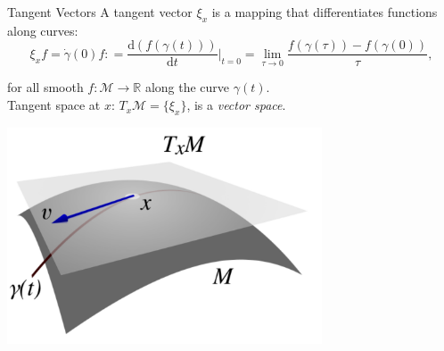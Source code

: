 \documentclass[xcolor=dvipsnames,t]{beamer} %
\newcommand{\reals}{\mathbb{R}}
\newcommand{\drm}{\mathrm{d}}
\newcommand{\defeq}{\mathrel{\mathop:}=}
\begin{document}
\begin{frame}{Tangent Vectors}
   A tangent vector $\xi_x$ is a mapping that differentiates functions along curves:\\[-1em]
   
   \[ \xi_x f = \dot{\gamma}(0)f \defeq \dfrac{\drm(f(\gamma(t)))}{\drm t}\biggr|_{t=0} = \lim_{\tau\to 0}\dfrac{f(\gamma(\tau))-f(\gamma(0))}{\tau}, \] 
   
   \noindent for all smooth $f:\mathcal{M}\to\reals$ along the curve $\gamma(t)$.\\

   \noindent Tangent space at $x$: $T_x\mathcal{M} = \{\xi_x\}$, is a \emph{vector space}.

   \begin{center}
      \includegraphics[width=0.7\textwidth]{figures/tangent_space.pdf}
   \end{center}
\end{frame}
\end{document}
